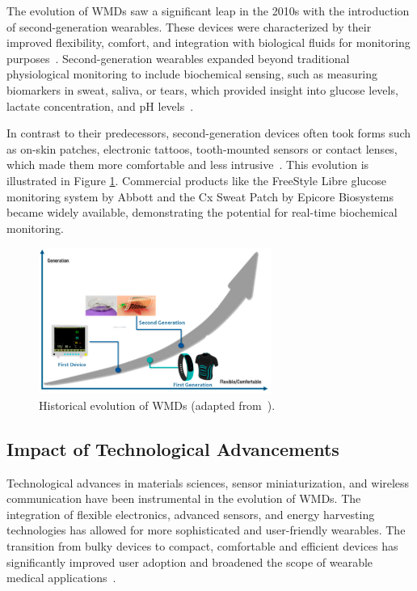 \documentclass[journal]{IEEEtran}
\begin{document}
    The evolution of WMDs saw a significant leap in the 2010s with the introduction of second-generation wearables. These devices were characterized by their improved flexibility, comfort, and integration with biological fluids for monitoring purposes~\cite{Ates2022}. Second-generation wearables expanded beyond traditional physiological monitoring to include biochemical sensing, such as measuring biomarkers in sweat, saliva, or tears, which provided insight into glucose levels, lactate concentration, and pH levels~\cite{Luo2024}.

    In contrast to their predecessors, second-generation devices often took forms such as on-skin patches, electronic tattoos, tooth-mounted sensors or contact lenses, which made them more comfortable and less intrusive~\cite{Ates2022}. This evolution is illustrated in Figure \ref{fig:histoy}. Commercial products like the FreeStyle Libre glucose monitoring system by Abbott and the Cx Sweat Patch by Epicore Biosystems became widely available, demonstrating the potential for real-time biochemical monitoring.

    \begin{figure}[ht]
    \centering
    \includegraphics[width=3in]{Wearables_SEB_2024-2025_Group1/Figuras/history.jpeg}
    \caption{Historical evolution of WMDs (adapted from~\cite{Ates2022}).}

    \label{fig:histoy}
    \end{figure}

    \subsection{Impact of Technological Advancements}

    Technological advances in materials sciences, sensor miniaturization, and wireless communication have been instrumental in the evolution of WMDs. The integration of flexible electronics, advanced sensors, and energy harvesting technologies has allowed for more sophisticated and user-friendly wearables. The transition from bulky devices to compact, comfortable and efficient devices has significantly improved user adoption and broadened the scope of wearable medical applications~\cite{Ates2022}.
\end{document}
